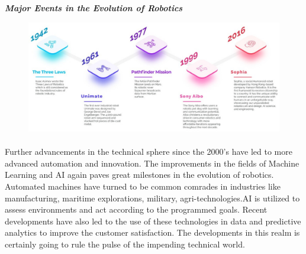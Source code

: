 \newpage
\begin{fullwidth}
    \centering
    \textbf{\textit{Major Events in the Evolution of Robotics}}
    \vspace{0.5cm}
     \begin{figure}[h!]
        \centering
        \includegraphics[width=\textwidth]{Images/Intro_robotics/timeline.jpeg}
    \end{figure}
\end{fullwidth}

\paragraph{ } Further advancements in the technical sphere since the 2000's have led to more advanced automation and innovation. The improvements in the fields of Machine Learning and \ac{AI} again paves great milestones in the evolution of robotics. Automated machines have turned to be common comrades in industries like manufacturing, maritime explorations, military, agri-technologies.\ac{AI} is utilized to assess environments and act according to the programmed goals.
Recent developments have also led to the use of these technologies in data and predictive analytics to improve the customer satisfaction. The developments in this realm is certainly going to rule the pulse of the impending technical world.
